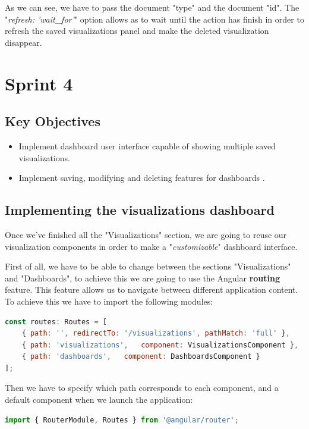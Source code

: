 \documentclass[a4paper, 12pt, english]{book}
\begin{document}
As we can see, we have to pass the document "type" and the document "id". The "\textit{refresh: 'wait\_for'}" option allows as to wait until the action has finish in order to refresh the saved visualizations panel and make the deleted visualization disappear.


\section{Sprint 4}
\label{sec:sprint-4}

\subsection{Key Objectives}
\label{sec:key-objectives}
\begin{itemize}
    \item Implement dashboard user interface capable of showing multiple saved visualizations.
    \item Implement saving, modifying and deleting features for dashboards .
\end{itemize}

\subsection{Implementing the visualizations dashboard}
\label{sec:visualizations-dashboard}
Once we've finished all the "Visualizations" section, we are going to reuse our visualization components in order to make a "\textit{customizable}" dashboard interface.

First of all, we have to be able to change between the sections "Visualizations" and "Dashboards", to achieve this we are going to use the Angular \textbf{routing} feature. This feature allows us to navigate between different application content. To achieve this we have to import the following modules:
\begin{lstlisting}[language=javascript, caption=Paths definition, label=code:dashboard-object]
const routes: Routes = [
	{ path: '', redirectTo: '/visualizations', pathMatch: 'full' },
	{ path: 'visualizations',	component: VisualizationsComponent },
	{ path: 'dashboards',	component: DashboardsComponent }
];
\end{lstlisting}

Then we have to specify which path corresponds to each component, and a default component when we launch the application:
\begin{lstlisting}[language=javascript, caption=Routing modules, label=code:dashboard-object]
import { RouterModule, Routes } from '@angular/router';
\end{lstlisting}
\end{document}

